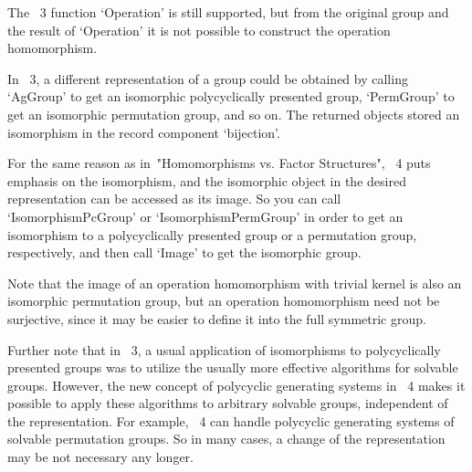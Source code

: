 The {\GAP}~3 function `Operation' is still supported,
but from the original group and the result of `Operation' it is not
possible to construct the operation homomorphism.



In {\GAP}~3, a different representation of a group could be obtained by
calling `AgGroup' to get an isomorphic polycyclically presented group,
`PermGroup' to get an isomorphic permutation group, and so on.
The returned objects stored an isomorphism in the record component
`bijection'.

For the same reason as in~"Homomorphisms vs. Factor Structures",
{\GAP}~4 puts emphasis on the isomorphism,
and the isomorphic object in the desired representation can be accessed
as its image.
So you can call `IsomorphismPcGroup' or `IsomorphismPermGroup' in order
to get an isomorphism to a polycyclically presented group or a
permutation group, respectively, and then call `Image' to get the
isomorphic group.

Note that the image of an operation homomorphism with trivial kernel is
also an isomorphic permutation group,
but an operation homomorphism need not be surjective,
since it may be easier to define it into the full symmetric group.

Further note that in {\GAP}~3, a usual application of isomorphisms to
polycyclically presented groups was to utilize the usually more effective
algorithms for solvable groups.
However, the new concept of polycyclic generating systems in {\GAP}~4
makes it possible to apply these algorithms to arbitrary solvable groups,
independent of the representation.
For example, {\GAP}~4 can handle polycyclic generating systems of
solvable permutation groups.
So in many cases, a change of the representation may be not necessary any
longer.




